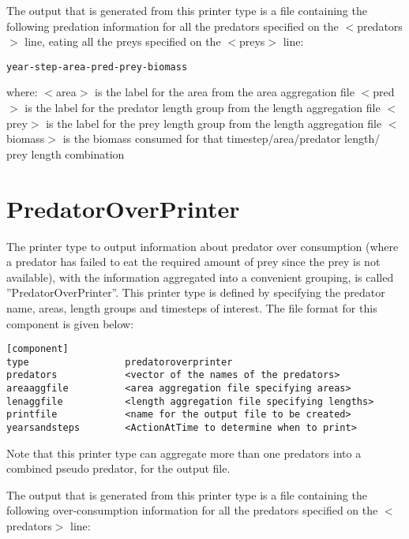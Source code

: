 \documentclass [a4paper, 10pt]{book}
\begin{document}
\bigskip
The output that is generated from this printer type is a file containing the following predation information for all the predators specified on the $<$predators$>$ line, eating all the preys specified on the $<$preys$>$ line:

{\small\begin{verbatim}
year-step-area-pred-prey-biomass
\end{verbatim}}

where:\newline
$<$area$>$ is the label for the area from the area aggregation file\newline
$<$pred$>$ is the label for the predator length group from the length aggregation file\newline
$<$prey$>$ is the label for the prey length group from the length aggregation file\newline
$<$biomass$>$ is the biomass consumed for that timestep/area/predator length/ prey length combination

\section{PredatorOverPrinter}\label{sec:predatoroverprinter}
The printer type to output information about predator over consumption (where a predator has failed to eat the required amount of prey since the prey is not available), with the information aggregated into a convenient grouping, is called ''PredatorOverPrinter''.  This printer type is defined by specifying the predator name, areas, length groups and timesteps of interest.  The file format for this component is given below:

{\small\begin{verbatim}
[component]
type                 predatoroverprinter
predators            <vector of the names of the predators>
areaaggfile          <area aggregation file specifying areas>
lenaggfile           <length aggregation file specifying lengths>
printfile            <name for the output file to be created>
yearsandsteps        <ActionAtTime to determine when to print>
\end{verbatim}}

Note that this printer type can aggregate more than one predators into a combined pseudo predator, for the output file.

\bigskip
The output that is generated from this printer type is a file containing the following over-consumption information for all the predators specified on the $<$predators$>$ line:
\end{document}
